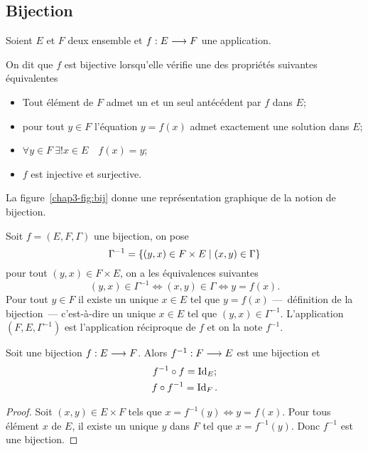 \subsection{Bijection}
\label{chap3-subsubsec:bijection}

Soient \(E\) et \(F\) deux ensemble et \(f:E \longrightarrow{} F\) une application.
\begin{defdef}
  On dit que \(f\) est bijective lorsqu'elle vérifie une des propriétés 
  suivantes équivalentes
  \begin{itemize}
    \item Tout élément de \(F\) admet un et un seul antécédent par \(f\) 
      dans \(E\);
    \item pour tout \(y \in F\) l'équation \(y = f(x)\) admet exactement une 
      solution dans \(E\);
    \item \(\forall y \in F \ \exists! x \in E \quad f(x) = y\);
    \item \(f\) est injective et surjective.
  \end{itemize}
  La figure~\ref{chap3-fig:bij} donne une représentation graphique de la 
  notion de bijection.
\end{defdef}

Soit \(f = (E, F, \Gamma)\) une bijection, on pose 
\begin{equation}
  \Gamma^{-1} = \left\{(y,x) \in F \times E\mathrel{}\middle|\mathrel{}(x,y) \in \Gamma\right\}
\end{equation}
pour tout \((y,x) \in F \times E\), on a les équivalences suivantes
\begin{equation}
  (y, x) \in \Gamma^{-1} \iff (x, y) \in \Gamma \iff y = f(x).
\end{equation}
Pour tout \(y \in F\) il existe un unique \(x \in E\) tel que \(y = f(x)\) 
---~définition de la bijection~--- c'est-à-dire un unique \(x \in E\) tel que 
\((y,x) \in \Gamma^{-1}\). L'application \((F,E,\Gamma^{-1})\) est l'application 
réciproque de \(f\) et on la note \(f^{-1}\).

\begin{prop} Soit une bijection \(f:E \longrightarrow{} F\). Alors 
  \(f^{-1}:F \longrightarrow{} E\) est une bijection et
  \begin{gather}
    f^{-1} \circ f  = \operatorname{Id}_E; \\
    f \circ f^{-1} = \operatorname{Id}_F.
  \end{gather}
\end{prop}

\begin{proof}
  Soit \((x, y) \in E \times F\) tels que \(x = f^{-1}(y) \iff y = f(x)\). Pour 
  tous élément \(x\) de \(E\), il existe un unique \(y\) dans \(F\) tel que 
  \(x = f^{-1}(y)\). Donc \(f^{-1}\) est une bijection.
\end{proof}

